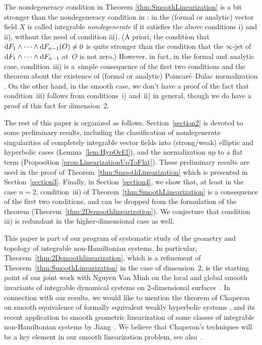 \documentclass[11pt]{article}
\numberwithin{equation}{section}
\begin{document}
The nondegeneracy condition in Theorem \ref{thm:SmoothLinearization} is a bit stronger than the nondegeneracy
condition in \cite{Zung-Nondegenerate2015}: in \cite{Zung-Nondegenerate2015} the (formal or analytic)
vector f\/ield $X$ is called integrable \emph{nondegenerate} if it satisf\/ies the above conditions i) and ii), without the
need of condition iii). (A priori, the condition that ${\rm d}F_1 \wedge \dots \wedge {\rm d}F_{n-1}(O) \neq 0$ is quite stronger than the condition that the $\infty$-jet of ${\rm d}F_1 \wedge \dots \wedge {\rm d}F_{n-1}$ at~$O$ is not zero.) However, in fact, in the formal and analytic case, condition~iii) is a~simple consequence of the f\/irst two conditions and the theorem about the existence of (formal or analytic) Poincar\'e--Dulac normalization
\cite{Zung-Poincare2002,Zung-Nondegenerate2015}. On the other hand, in the smooth case,
we don't have a proof of the fact that condition~iii) follows
from conditions~i) and~ii) in general, though we do have a proof of this fact for dimension~2.

The rest of this paper is organized as follows. Section~\ref{section2} is devoted to some preliminary
results, including the classif\/ication
of nondegenerate singularities of completely integrable vector f\/ields into (strong/weak)
elliptic and hyperbolic cases (Lemma~\ref{lem:HypOrEl}), and
the normalization up to a f\/lat term (Proposition \ref{prop:LinearizationUpToFlat}). These preliminary results
are used in the proof of Theo\-rem~\ref{thm:SmoothLinearization} which is presented in Section~\ref{section3}.
Finally, in Section~\ref{section4}, we show that, at least in the case $n=2$, condition~iii) of
Theorem~\ref{thm:SmoothLinearization} is a consequence of the f\/irst two conditions, and can be dropped
from the formulation of the theorem (Theorem~\ref{thm:2Dsmoothlinearization}). We conjecture that
condition iii) is redundant in the higher-dimensional case as well.

This paper is part of our program of systematic study of the geometry and topology
of integrable non-Hamiltonian systems. In particular, Theorem~\ref{thm:2Dsmoothlinearization},
which is a ref\/inement of Theo\-rem~\ref{thm:SmoothLinearization} in the case of dimension~2,
is the starting point of our joint work with Nguyen Van Minh on the
local and global smooth invariants of integrable dynamical
systems on 2-dimensional surfaces~\cite{ZungMinh_2D2012}. In connection
with our results, we would
like to mention the theorem of Cha\-pe\-ron on smooth equivalence of formally equivalent weakly
hyperbolic systems \cite{Chaperon-WeakHyperbolic2013}, and its recent application to smooth
geometric linearization of some classes of integrable non-Hamiltonian
systems by Jiang~\cite{Jiang-WeakHyp2016}. We believe that Chaperon's techniques will be
a key element in our smooth linearization problem, see also~\cite{Zung-Integrable2016}.
\end{document}
